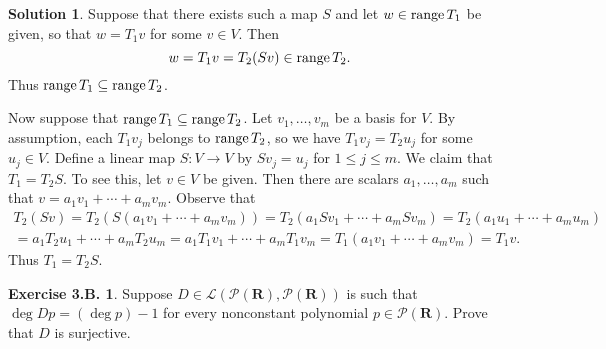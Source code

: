 \documentclass[12pt]{article}
\theoremstyle{definition}
\theoremstyle{exercise}
\newtheorem{exercise}{Exercise 3.B.}
\theoremstyle{solution}
\newtheorem*{solution}{Solution}
\newcommand{\poly}{\mathcal{P}}
\newcommand{\lmap}{\mathcal{L}}
\newcommand{\Range}{\text{range\,}}
\newcommand{\R}{\mathbf{R}}
\begin{document}
\begin{solution}
    Suppose that there exists such a map \( S \) and let \( w \in \Range T_1 \) be given, so that \( w = T_1 v \) for some \( v \in V \). Then
    \[
        w = T_1 v = T_2(Sv) \in \Range T_2.
    \]
    Thus \( \Range T_1 \subseteq \Range T_2 \).

    Now suppose that \( \Range T_1 \subseteq \Range T_2 \). Let \( v_1, \ldots, v_m \) be a basis for \( V \). By assumption, each \( T_1 v_j \) belongs to \( \Range T_2 \), so we have \( T_1 v_j = T_2 u_j \) for some \( u_j \in V \). Define a linear map \( S : V \to V \) by \( Sv_j = u_j \) for \( 1 \leq j \leq m \). We claim that \( T_1 = T_2 S \). To see this, let \( v \in V \) be given. Then there are scalars \( a_1, \ldots, a_m \) such that \( v = a_1 v_1 + \cdots + a_m v_m \). Observe that
    \begin{multline*}
        T_2(Sv) = T_2 (S(a_1 v_1 + \cdots + a_m v_m)) = T_2 (a_1 Sv_1 + \cdots + a_m Sv_m) = T_2 (a_1 u_1 + \cdots + a_m u_m) \\ = a_1 T_2 u_1 + \cdots + a_m T_2 u_m = a_1 T_1 v_1 + \cdots + a_m T_1 v_m = T_1 (a_1 v_1 + \cdots + a_m v_m) = T_1 v.
    \end{multline*}
    Thus \( T_1 = T_2 S \).
\end{solution}

\begin{exercise}
\label{ex:26}
    Suppose \( D \in \lmap(\poly(\R), \poly(\R)) \) is such that \( \deg Dp = (\deg p) - 1 \) for every nonconstant polynomial \( p \in \poly(\R) \). Prove that \( D \) is surjective.

    \noindent [\textit{The notation \( D \) is used above to remind you of the differentiation map that sends a polynomial \( p \) to \( p' \). Without knowing the formula for the derivative of a polynomial (except that it reduces the degree by 1), you can use the exercise above to show that for every polynomial \( q \in \poly(\R) \), there exists a polynomial \( p \in \poly(\R) \) such that \( p' = q \).}]
\end{exercise}
\end{document}
